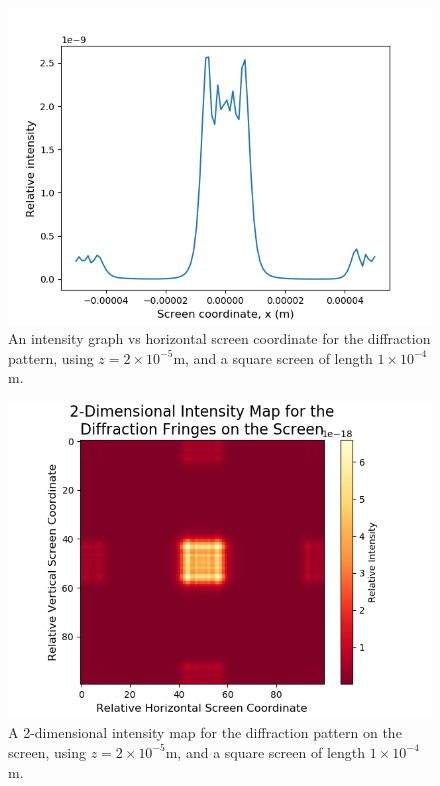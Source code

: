 \documentclass[twocolumn,prl,nobalancelastpage,aps,10pt]{revtex4-1}
\begin{document}
\begin{figure}
	\includegraphics*[width=0.96\linewidth,clip]{1D_z2e-5}
	\caption{An intensity graph vs horizontal screen coordinate for the diffraction pattern, using $z = 2\times10^{-5}$m, and a square screen of length $1\times10^{-4}$m.} \label{1D_smallerZ}
\end{figure}

\begin{figure}
	\includegraphics*[width=0.96\linewidth,clip]{2D_z2e-5}
	\caption{A 2-dimensional intensity map for the diffraction pattern on the screen, using $z = 2\times10^{-5}$m, and a square screen of length $1\times10^{-4}$m.} \label{2D_smallerZ}
\end{figure}
\end{document}
